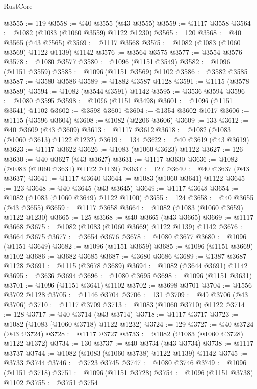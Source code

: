 \begin{lexlean}{RustCore}
\begin{coremodule}
@3555 := 119
@3558 := @40 @3555 (@43 @3555)
@3559 := @1117 @3558
@3564 := @1082 (@1083 (@1060 @3559) @1122 @1230)
@3565 := 120
@3568 := @40 @3565 (@43 @3565)
@3569 := @1117 @3568
@3575 := @1082 (@1083 (@1060 @3569) @1122 @1139) @1142
@3576 := @3564 @3575
@3577 := @3554 @3576
@3578 := @1080 @3577
@3580 := @1096 (@1151 @3549)
@3582 := @1096 (@1151 @3559)
@3585 := @1096 (@1151 @3569) @1102
@3586 := @3582 @3585
@3587 := @3580 @3586
@3589 := @1882 @3587 @1128
@3591 := @1115 (@3578 @3589)
@3594 := @1082 (@3544 @3591) @1142
@3595 := @3536 @3594
@3596 := @1080 @3595
@3598 := @1096 (@1151 @3498)
@3601 := @1096 (@1151 @3541) @1102
@3602 := @3598 @3601
@3604 := @1354 @3602 @1017
@3606 := @1115 (@3596 @3604)
@3608 := @1082 (@2206 @3606)
@3609 := 133
@3612 := @40 @3609 (@43 @3609)
@3613 := @1117 @3612
@3618 := @1082 (@1083 (@1060 @3613) @1122 @1232)
@3619 := 134
@3622 := @40 @3619 (@43 @3619)
@3623 := @1117 @3622
@3626 := @1083 (@1060 @3623) @1122
@3627 := 126
@3630 := @40 @3627 (@43 @3627)
@3631 := @1117 @3630
@3636 := @1082 (@1083 (@1060 @3631) @1122 @1139)
@3637 := 127
@3640 := @40 @3637 (@43 @3637)
@3641 := @1117 @3640
@3644 := @1083 (@1060 @3641) @1122
@3645 := 123
@3648 := @40 @3645 (@43 @3645)
@3649 := @1117 @3648
@3654 := @1082 (@1083 (@1060 @3649) @1122 @1100)
@3655 := 124
@3658 := @40 @3655 (@43 @3655)
@3659 := @1117 @3658
@3664 := @1082 (@1083 (@1060 @3659) @1122 @1230)
@3665 := 125
@3668 := @40 @3665 (@43 @3665)
@3669 := @1117 @3668
@3675 := @1082 (@1083 (@1060 @3669) @1122 @1139) @1142
@3676 := @3664 @3675
@3677 := @3654 @3676
@3678 := @1080 @3677
@3680 := @1096 (@1151 @3649)
@3682 := @1096 (@1151 @3659)
@3685 := @1096 (@1151 @3669) @1102
@3686 := @3682 @3685
@3687 := @3680 @3686
@3689 := @1387 @3687 @1128
@3691 := @1115 (@3678 @3689)
@3694 := @1082 (@3644 @3691) @1142
@3695 := @3636 @3694
@3696 := @1080 @3695
@3698 := @1096 (@1151 @3631)
@3701 := @1096 (@1151 @3641) @1102
@3702 := @3698 @3701
@3704 := @1556 @3702 @1128
@3705 := @1146 @3704
@3706 := 131
@3709 := @40 @3706 (@43 @3706)
@3710 := @1117 @3709
@3713 := @1083 (@1060 @3710) @1122
@3714 := 128
@3717 := @40 @3714 (@43 @3714)
@3718 := @1117 @3717
@3723 := @1082 (@1083 (@1060 @3718) @1122 @1232)
@3724 := 129
@3727 := @40 @3724 (@43 @3724)
@3728 := @1117 @3727
@3733 := @1082 (@1083 (@1060 @3728) @1122 @1372)
@3734 := 130
@3737 := @40 @3734 (@43 @3734)
@3738 := @1117 @3737
@3744 := @1082 (@1083 (@1060 @3738) @1122 @1139) @1142
@3745 := @3733 @3744
@3746 := @3723 @3745
@3747 := @1080 @3746
@3749 := @1096 (@1151 @3718)
@3751 := @1096 (@1151 @3728)
@3754 := @1096 (@1151 @3738) @1102
@3755 := @3751 @3754

\end{coremodule}
\end{lexlean}
